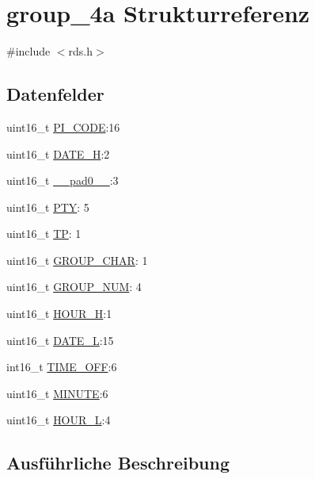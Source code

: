 \hypertarget{structgroup__4a}{}\section{group\+\_\+4a Strukturreferenz}
\label{structgroup__4a}


{\ttfamily \#include $<$rds.\+h$>$}

\subsection*{Datenfelder}
\begin{DoxyCompactItemize}
\item 
uint16\+\_\+t \hyperlink{structgroup__4a_a5cd9b1f6413028425796c1129aa8fd87}{P\+I\+\_\+\+C\+O\+D\+E}\+:16
\item 
uint16\+\_\+t \hyperlink{structgroup__4a_a3e79884699012bd2127da5d0d474072b}{D\+A\+T\+E\+\_\+\+H}\+:2
\item 
uint16\+\_\+t \hyperlink{structgroup__4a_a77132c2c26a75f5b8751b235cda23828}{\+\_\+\+\_\+pad0\+\_\+\+\_\+}\+:3
\item 
uint16\+\_\+t \hyperlink{structgroup__4a_a0474967478fbbc2c71b800d2e0132d45}{P\+T\+Y}\+: 5
\item 
uint16\+\_\+t \hyperlink{structgroup__4a_ab9e634c63b0d95a96716d5f6d7f06d72}{T\+P}\+: 1
\item 
uint16\+\_\+t \hyperlink{structgroup__4a_a66d4119990dc4c3e040a43885e9bb953}{G\+R\+O\+U\+P\+\_\+\+C\+H\+A\+R}\+: 1
\item 
uint16\+\_\+t \hyperlink{structgroup__4a_a9f692e9f76ee88348d426bcd4e9bc70b}{G\+R\+O\+U\+P\+\_\+\+N\+U\+M}\+: 4
\item 
uint16\+\_\+t \hyperlink{structgroup__4a_a2adde330ffff3e30d1ba194fdb0835cf}{H\+O\+U\+R\+\_\+\+H}\+:1
\item 
uint16\+\_\+t \hyperlink{structgroup__4a_a41f1477fa1205c5f2c4135c43419f931}{D\+A\+T\+E\+\_\+\+L}\+:15
\item 
int16\+\_\+t \hyperlink{structgroup__4a_ad17cf07501152f576f64d6bf9d06b453}{T\+I\+M\+E\+\_\+\+O\+F\+F}\+:6
\item 
uint16\+\_\+t \hyperlink{structgroup__4a_a4377c294f04582b75e2fcd4134fdeb46}{M\+I\+N\+U\+T\+E}\+:6
\item 
uint16\+\_\+t \hyperlink{structgroup__4a_a20911a4551f89f8c37cc760f72ec2d4d}{H\+O\+U\+R\+\_\+\+L}\+:4
\end{DoxyCompactItemize}


\subsection{Ausführliche Beschreibung}


